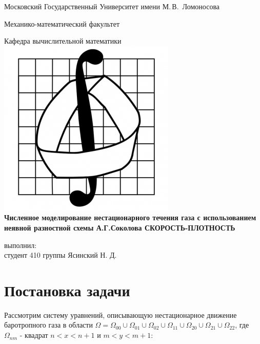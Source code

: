 \documentclass[specialist,subf,href,colorlinks=true,12pt
,times,mtpro,specialist
]{disser}
\begin{document}
\author{Ясинский Никита}

\begin{titlepage}
\begin{center}
Московский Государственный Университет имени М.\,В.~Ломоносова

Механико-математический факультет

Кафедра вычислительной математики\\[0.6cm]

\includegraphics[scale=1]{mm_logo} \\[0.6cm]

{\bf \normalsize Численное моделирование нестационарного течения газа с использованием неявной разностной схемы А.Г.Соколова СКОРОСТЬ-ПЛОТНОСТЬ}\\[0.5cm]

\end{center}

\vspace{1.5cm}
\begin{flushright}
{ выполнил:}\\
студент 410 группы Ясинский Н. Д.\\[0.5cm]
\vspace{1cm}
\end{flushright}

\end{titlepage}

\tableofcontents

\section {Постановка задачи}
Рассмотрим систему уравнений, описывающую нестационарное движение баротропного газа в области $\Omega = \Omega_{00} \cup \Omega_{01} \cup \Omega_{02} \cup \Omega_{11} \cup \Omega_{20} \cup \Omega_{21} \cup \Omega_{22}$, где $\Omega_{nm}$ - квадрат $n < x < n + 1$ и $m < y < m + 1$:
\end{document}
